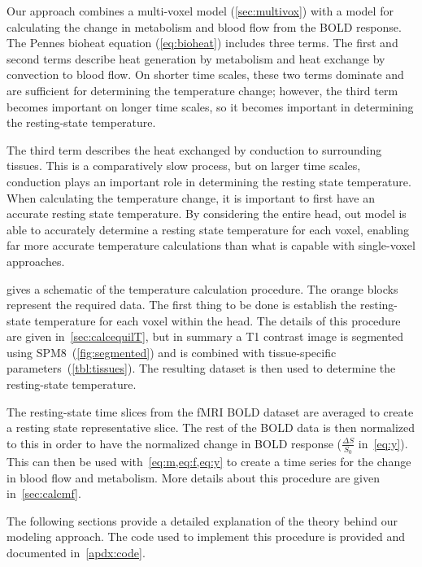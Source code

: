   Our approach combines a multi-voxel model (\cref{sec:multivox}) with a model for calculating the change in metabolism and blood flow from the BOLD response.  The Pennes bioheat equation (\cref{eq:bioheat}) \citep{pennes,sotero2011} includes three terms. The first and second terms describe heat generation by metabolism and heat exchange by convection to blood flow.  On shorter time scales, these two terms dominate and are sufficient for determining the temperature change; however, the third term becomes important on longer time scales, so it becomes important in determining the resting-state temperature.
  
  The third term describes the heat exchanged by conduction to surrounding tissues.  This is a comparatively slow process, but on larger time scales, conduction plays an important role in determining the resting state temperature.  When calculating the temperature change, it is important to first have an accurate resting state temperature.  By considering the entire head, out model is able to accurately determine a resting state temperature for each voxel, enabling far more accurate temperature calculations than what is capable with single-voxel approaches.  
  
   gives a schematic of the temperature calculation procedure.  The orange blocks represent the required data.  The first thing to be done is establish the resting-state temperature for each voxel within the head.  The details of this procedure are given in~\cref{sec:calcequilT}, but in summary a T1 contrast image is segmented using SPM8~(\cref{fig:segmented}) and is combined with tissue-specific parameters~(\cref{tbl:tissues}).  The resulting dataset is then used to determine the resting-state temperature. 
  
  The resting-state time slices from the fMRI BOLD dataset are averaged to create a resting state representative slice.  The rest of the BOLD data is then normalized to this in order to have the normalized change in BOLD response ($\frac{\Delta S}{S_0}$ in~\cref{eq:y}).  This can then be used with~\cref{eq:m,eq:f,eq:y} to create a time series for the change in blood flow and metabolism.  More details about this procedure are given in~\cref{sec:calcmf}.
  
  The following sections provide a detailed explanation of the theory behind our modeling approach.  The code used to implement this procedure is provided and documented in~\cref{apdx:code}.  
  
